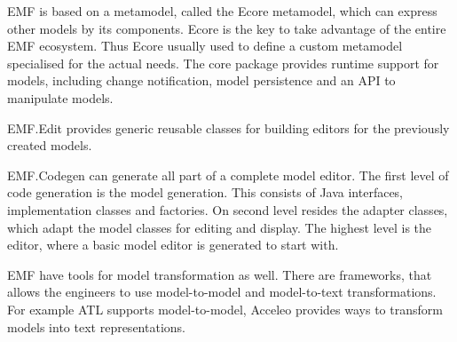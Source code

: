 EMF is based on a metamodel, called the Ecore metamodel, which can express other models by its components. Ecore is the key to take advantage of the entire EMF ecosystem. Thus Ecore usually used to define a custom metamodel specialised for the actual needs. The core package provides runtime support for models, including change notification, model persistence and an API to manipulate models.

EMF.Edit provides generic reusable classes for building editors for the previously created models.

EMF.Codegen can generate all part of a complete model editor. The first level of code generation is the model generation. This consists of Java interfaces, implementation classes and factories. On second level resides the adapter classes, which adapt the model classes for editing and display. The highest level is the editor, where a basic model editor is generated to start with.

EMF have tools for model transformation as well. There are frameworks, that allows the engineers to use model-to-model and model-to-text transformations. For example ATL supports model-to-model, Acceleo provides ways to transform models into text representations.



